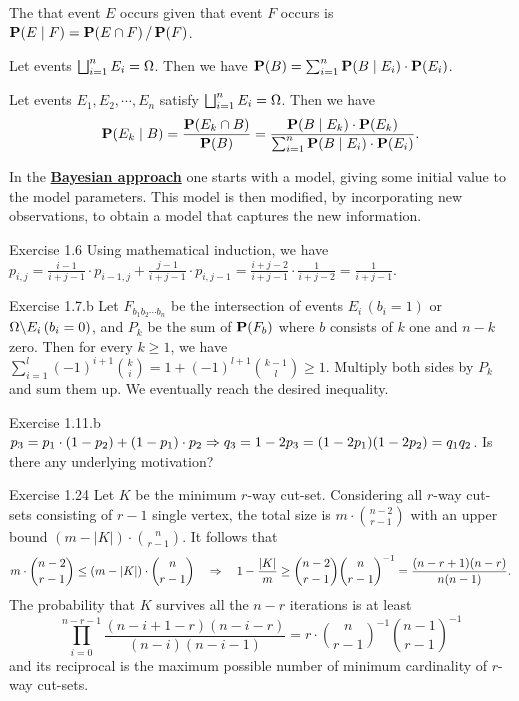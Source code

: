 \documentclass[main.tex]{subfiles}
\begin{document}
The  that event $E$ occurs given that event $F$ occurs is $\mathbf{P}(E \mid F) = \mathbf{P}(E \cap F) \,/\, \mathbf{P}(F)$.

\begin{theorem}
	Let events $\bigsqcup_{i=1}^{n} E_i = \Omega$. Then we have $\mathbf{P}(B) = \sum_{i=1}^{n} \mathbf{P}(B \mid E_i)\cdot \mathbf{P}(E_i)$. 
\end{theorem}

\begin{theorem}
	Let events $E_1,E_2,\cdots,E_n$ satisfy $\bigsqcup_{i=1}^{n} E_i = \Omega$. Then we have
	\[
		\mathbf{P}(E_k \mid B) = \frac{\mathbf{P}(E_k \cap B)}{\mathbf{P}(B)}
		= \frac{\mathbf{P}(B \mid E_k)\cdot \mathbf{P}(E_k)}{\sum_{i=1}^{n}\mathbf{P}(B \mid E_i) \cdot \mathbf{P}(E_i)}.
	\] 
\end{theorem}

In the \href{https://en.wikipedia.org/wiki/Bayesian_inference}{\bf Bayesian approach} one starts with a  model, giving some initial value to the model parameters. This model is then modified, by incorporating new observations, to obtain a  model that captures the new information.

\bigskip

{\bs Exercise 1.6}
Using mathematical induction, we have $p_{i,j} = \frac{i-1}{i+j-1}\cdot p_{i-1,j} + \frac{j-1}{i+j-1}\cdot p_{i,j-1} = \frac{i+j-2}{i+j-1}\cdot\frac{1}{i+j-2} = \frac{1}{i+j-1}$.

{\bs Exercise 1.7.b} 
Let $F_{b_1b_2\cdots b_n}$ be the intersection of events $E_i\,(b_i=1)$ or $\Omega\backslash E_i\,(b_i=0)$, and $P_{k}$ be the sum of $\mathbf{P}(F_b)$ where $b$ consists of $k$ one and $n-k$ zero. Then for every $k \ge 1$, we have $\sum_{i=1}^{l}(-1)^{i+1}\binom{k}{i} = 1 + (-1)^{l+1}\binom{k-1}{l} \ge 1$. Multiply both sides by $P_k$ and sum them up. We eventually reach the desired inequality.

{\bs Exercise 1.11.b\ }
$p_3 = p_1\cdot (1-p_2) + (1-p_1) \cdot p_2 \Rightarrow q_3 = 1-2p_3 = (1-2p_1)(1-2p_2) = q_1q_2$. Is there any underlying motivation?

{\bs Exercise 1.24} \href{https://en.wikipedia.org/wiki/Karger's_algorithm}{} Let $K$ be the minimum $r$-way cut-set. Considering all $r$-way cut-sets consisting of $r-1$ single vertex, the total size is $m\cdot \binom{n-2}{r-1}$ with an upper bound $(m-|K|)\cdot \binom{n}{r-1}$. It follows that
	\[
	m \cdot \binom{n-2}{r-1} \le (m-|K|)\cdot \binom{n}{r-1} \quad\Rightarrow\quad 1-\frac {|K|}{m} \ge \binom{n-2}{r-1}\binom n{r-1}^{-1}=\frac{(n-r+1)(n-r)}{n(n-1)}.
	\]
The probability that $K$ survives all the $n-r$ iterations is at least
	\[
		\prod_{i=0}^{n-r-1}\frac{(n-i+1-r)(n-i-r)}{(n-i)(n-i-1)} = r\cdot \binom{n}{r-1}^{-1}\binom{n-1}{r-1}^{-1}
	\]
and its reciprocal is the maximum possible number of minimum cardinality of $r$-way cut-sets.
\end{document}
